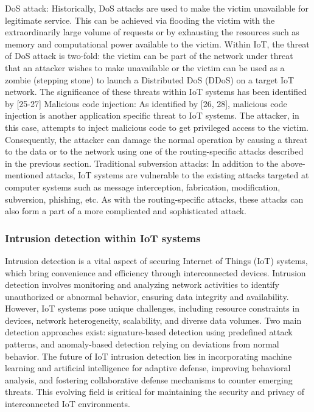 \documentclass[letterpaper, 10 pt, conference]{ieeeconf}  %
\begin{document}
DoS attack: Historically, DoS attacks are used to make the victim unavailable for legitimate service. This can be achieved via flooding the victim with the extraordinarily large volume of requests or by exhausting the resources such as memory and computational power available to the victim. Within IoT, the threat of DoS attack is two-fold: the victim can be part of the network under threat that an attacker wishes to make unavailable or the victim can be used as a zombie (stepping stone) to launch a Distributed DoS (DDoS) on a target IoT network. The significance of these threats within IoT systems has been identified by [25-27]
Malicious code injection: As identified by [26, 28], malicious code injection is another application specific threat to IoT systems. The attacker, in this case, attempts to inject malicious code to get privileged access to the victim. Consequently, the attacker can damage the normal operation by causing a threat to the data or to the network using one of the routing-specific attacks described in the previous section.
Traditional subversion attacks: In addition to the above-mentioned attacks, IoT systems are vulnerable to the existing attacks targeted at computer systems such as message interception, fabrication, modification, subversion, phishing, etc. As with the routing-specific attacks, these attacks can also form a part of a more complicated and sophisticated attack. \\

\subsubsection{Intrusion detection within IoT systems}
Intrusion detection is a vital aspect of securing Internet of Things (IoT) systems, which bring convenience and efficiency through interconnected devices. Intrusion detection involves monitoring and analyzing network activities to identify unauthorized or abnormal behavior, ensuring data integrity and availability. However, IoT systems pose unique challenges, including resource constraints in devices, network heterogeneity, scalability, and diverse data volumes. Two main detection approaches exist: signature-based detection using predefined attack patterns, and anomaly-based detection relying on deviations from normal behavior. The future of IoT intrusion detection lies in incorporating machine learning and artificial intelligence for adaptive defense, improving behavioral analysis, and fostering collaborative defense mechanisms to counter emerging threats. This evolving field is critical for maintaining the security and privacy of interconnected IoT environments. \\
\end{document}
